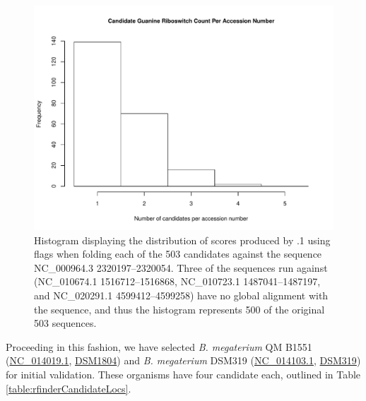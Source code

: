 \begin{figure}[!ht]
\centering
\includegraphics[width=.9\textwidth]{Figures/Ribofinder/candidateHistogramGroupedByAccession.pdf}
\caption{Histogram displaying the distribution of scores produced by .1 using flags  when folding each of
the 503 candidates against the \Bsxpt sequence NC\_000964.3 2320197--2320054.
Three of the sequences run against \foldalign (NC\_010674.1 1516712--1516868,
NC\_010723.1 1487041--1487197, and NC\_020291.1 4599412--4599258) have no global
alignment with the \Bsxpt sequence, and thus the histogram represents 500 of the
original 503 sequences.}
\label{fig:rfinder:candidateHistogramGroupedByAccession}
\end{figure}

Proceeding in this fashion, we have selected {\em B. megaterium} QM B1551
(\href{http://www.ncbi.nlm.nih.gov/nuccore/NC_014019.1}{NC\_014019.1},
\href{http://www.dsmz.de/catalogues/details/culture/DSM-1804.html}{DSM1804})
and {\em B. megaterium} DSM319
(\href{http://www.ncbi.nlm.nih.gov/nuccore/NC_014103.1}{NC\_014103.1},
\href{http://www.dsmz.de/catalogues/details/culture/DSM-319.html}{DSM319})
for initial validation. These organisms have four
candidate \grbs each, outlined in Table \ref{table:rfinderCandidateLocs}.

